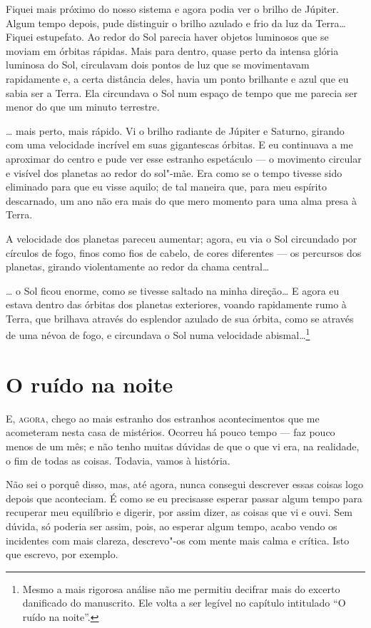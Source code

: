 Fiquei mais próximo do nosso sistema e agora podia ver o brilho de Júpiter. Algum tempo depois, pude distinguir o
brilho azulado e frio da luz da Terra\ldots{} Fiquei estupefato. Ao redor do Sol parecia haver objetos luminosos que se
moviam em órbitas rápidas. Mais para dentro, quase perto da intensa glória luminosa do Sol, circulavam dois pontos de
luz que se movimentavam rapidamente e, a certa distância deles, havia um ponto brilhante e azul que eu sabia ser a
Terra. Ela circundava o Sol num espaço de tempo que me parecia ser menor do que um minuto terrestre.

\ldots{} mais perto, mais rápido. Vi o brilho radiante de Júpiter e Saturno, girando com uma velocidade incrível em suas
gigantescas órbitas. E eu continuava a me aproximar do centro e pude ver esse estranho espetáculo --- o movimento
circular e visível dos planetas ao redor do sol"-mãe. Era como se o tempo tivesse sido eliminado para que eu visse
aquilo; de tal maneira que, para meu espírito descarnado, um ano não era mais do que mero momento para uma alma
presa à Terra.

A velocidade dos planetas pareceu aumentar; agora, eu via o Sol circundado por círculos de fogo, finos como fios de
cabelo, de cores diferentes --- os percursos dos planetas, girando violentamente ao redor da chama central\ldots{}

\ldots{} o Sol ficou enorme, como se tivesse saltado na minha direção\ldots{} E agora eu estava dentro das órbitas dos planetas
exteriores, voando rapidamente rumo à Terra, que brilhava através do esplendor azulado de sua órbita, como se através
de uma névoa de fogo, e circundava o Sol numa velocidade abismal\ldots{}\footnote{ Mesmo a mais rigorosa análise não me permitiu decifrar mais do excerto danificado do manuscrito. Ele volta a ser
legível no capítulo intitulado “O ruído na noite”.} 


\clearpage

\chapter{O ruído na noite}

\textsc{E, agora,} chego ao mais estranho dos estranhos acontecimentos que me acometeram nesta casa de mistérios. Ocorreu há
pouco tempo --- faz pouco menos de um mês; e não tenho muitas dúvidas de que o que vi era, na realidade, o fim de todas as
coisas. Todavia, vamos à história.

Não sei o porquê disso, mas, até agora, nunca consegui descrever essas coisas logo depois que aconteciam. É como se eu
precisasse esperar passar algum tempo para recuperar meu equilíbrio e digerir, por assim dizer, as coisas que vi e
ouvi. Sem dúvida, só poderia ser assim, pois, ao esperar algum tempo, acabo vendo os incidentes com mais clareza,
descrevo"-os com mente mais calma e crítica. Isto que escrevo, por exemplo.

